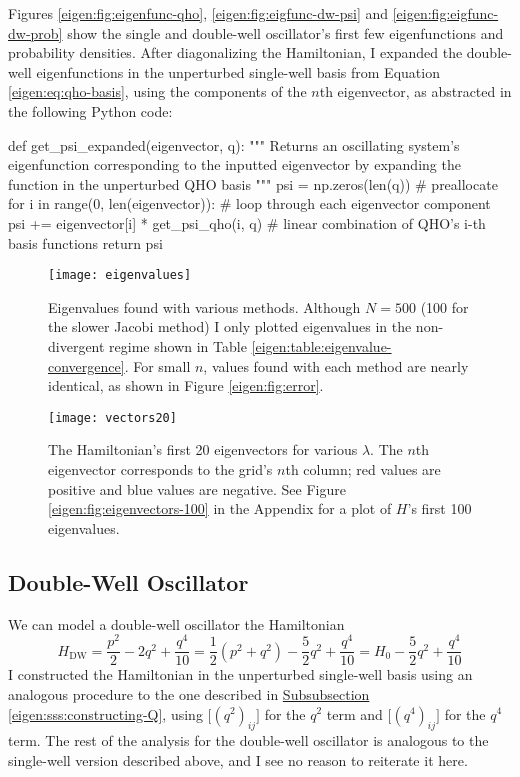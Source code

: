 \documentclass[11pt, a4paper]{article}
\begin{document}
Figures \ref{eigen:fig:eigenfunc-qho}, \ref{eigen:fig:eigfunc-dw-psi} and \ref{eigen:fig:eigfunc-dw-prob} show the single and double-well oscillator's first few eigenfunctions and probability densities. After diagonalizing the Hamiltonian, I expanded the double-well eigenfunctions in the unperturbed single-well basis from Equation \ref{eigen:eq:qho-basis}, using the components of the $ n $th eigenvector, as abstracted in the following Python code:

\begin{python}
def get_psi_expanded(eigenvector, q):
    """
    Returns an oscillating system's eigenfunction corresponding to the inputted eigenvector by expanding the function in the unperturbed QHO basis 
    """
    psi = np.zeros(len(q))  # preallocate 
    for i in range(0, len(eigenvector)):  # loop through each eigenvector component
        psi += eigenvector[i] * get_psi_qho(i, q)   # linear combination of QHO's i-th basis functions
    return psi
\end{python}


\begin{figure}[hbt!]
	\centering
	\texttt{[image: eigenvalues]}
	\caption{Eigenvalues found with various methods. Although $ N = 500 $ (100 for the slower Jacobi method) I only plotted eigenvalues in the non-divergent regime shown in Table \ref{eigen:table:eigenvalue-convergence}. For small $ n $, values found with each method are nearly identical, as shown in Figure \ref{eigen:fig:error}.}
	\label{eigen:fig:eigenvalues}
\end{figure}


\begin{figure}[hbt!]
	\centering
	\texttt{[image: vectors20]}
	\caption{The Hamiltonian's first 20 eigenvectors for various $ \lambda $. The $ n $th eigenvector corresponds to the grid's $ n $th column; red values are positive and blue values are negative. See Figure \ref{eigen:fig:eigenvectors-100} in the Appendix for a plot of $ H $'s first 100 eigenvalues.}
	\label{eigen:fig:eigenvectors-20}
\end{figure}


\subsection{Double-Well Oscillator}
We can model a double-well oscillator the Hamiltonian
\begin{equation*}
	H_{\text{DW}} = \frac{p^{2}}{2} - 2q^{2} + \frac{q^{4}}{10} = \frac{1}{2}(p^{2} + q^{2}) - \frac{5}{2}q^{2} + \frac{q^{4}}{10} = H_{0} - \frac{5}{2}q^{2} + \frac{q^{4}}{10} 
\end{equation*}
I constructed the Hamiltonian in the unperturbed single-well basis using an analogous procedure to the one described in \hyperref[eigen:sss:constructing-Q]{Subsubsection \ref{eigen:sss:constructing-Q}}, using $ \big[(q^{2})_{ij}\big] $ for the $ q^{2} $ term and $ \big[(q^{4})_{ij}\big] $ for the $ q^{4} $ term. The rest of the analysis for the double-well oscillator is analogous to the single-well version described above, and I see no reason to reiterate it here.
\end{document}
